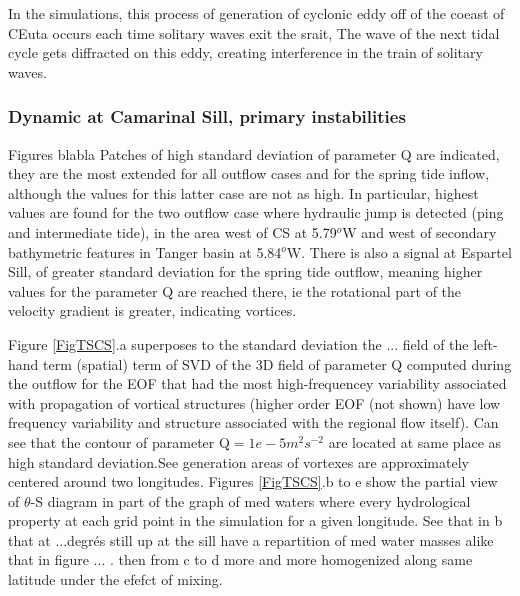 In the simulations, this process of generation of cyclonic eddy off of the coeast of CEuta occurs each time solitary waves exit the srait,  The wave of the next tidal cycle gets diffracted on this eddy, creating interference in the train of solitary waves.



\subsubsection{Dynamic at Camarinal Sill, primary instabilities}


Figures blabla  Patches of high standard deviation of parameter Q are indicated, they are the most extended for all outflow cases and for the spring tide inflow, although the values for this latter case are not as high. In particular, highest values are found for the two outflow case where hydraulic jump is detected (ping and intermediate tide), in the area west of CS at 5.79$^o$W and west of secondary bathymetric features in Tanger basin at 5.84$^o$W. There is also a signal at Espartel Sill, of greater standard deviation for the spring tide outflow, meaning higher values for the parameter Q are reached there, ie the rotational part of the velocity gradient is greater, indicating vortices. 

Figure \ref{FigTSCS}.a superposes to the standard deviation the ... field of the left-hand term (spatial) term of SVD of the 3D field of parameter Q computed during the outflow for the EOF that had the most high-frequencey variability associated with propagation of vortical structures (higher order EOF (not shown) have low frequency variability and structure associated with the regional flow itself). Can see that the contour of parameter Q$=1e-5m^2s^{-2}$ are located at same place as high standard deviation.See generation areas of vortexes are approximately centered around two longitudes. Figures \ref{FigTSCS}.b to e show the partial view of $\theta$-S diagram in part of the graph of med waters where every hydrological property at each grid point in the simulation for a given longitude. See that in b that at ...degrés still up at the sill have a repartition of med water masses alike that in figure ... . then from c to d more and more homogenized along same latitude under the efefct of mixing.

